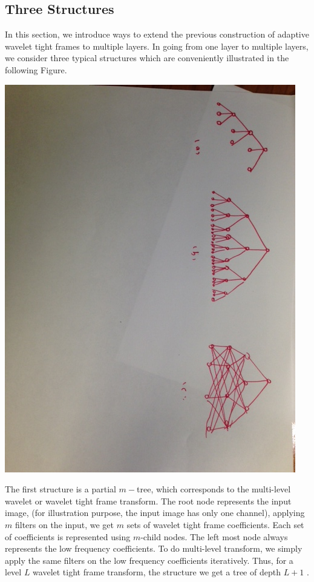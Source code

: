 \documentclass[a4paper]{article}
\begin{document}
\subsection{Three Structures}
In this section, we introduce ways to extend the previous construction of adaptive wavelet tight frames to multiple layers. In going from one layer to multiple layers, we consider three typical structures which are conveniently illustrated in the following Figure.
\begin{center}
\includegraphics[scale=0.4]{arch.jpg}
\end{center}

The first structure is a partial $m-$tree, which corresponds to the multi-level wavelet or wavelet tight frame transform. The root node represents the input image, (for illustration purpose, the input image has only one channel), applying $m$ filters on the input, we get $m$ sets of wavelet tight frame coefficients. Each set of coefficients is represented using $m$-child nodes. The left most node always represents the low frequency coefficients. To do multi-level transform, we simply apply the same filters on the low frequency coefficients iteratively. Thus, for a level $L$ wavelet tight frame transform, the structure we get a tree of depth $L+1$ . 
\end{document}
